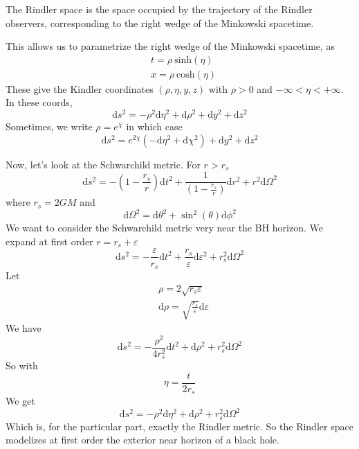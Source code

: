 \documentclass[a4paper]{book}
\theoremstyle{definition}
\theoremstyle{remark}
\begin{document}
The Rindler space is the space occupied by the trajectory of the Rindler observers, corresponding to the right wedge of the Minkowski spacetime. \par \medskip 
This allows us to parametrize the right wedge of the Minkowski spacetime, as 
\begin{equation}
   \begin{aligned}
    &t = \rho ~ \text{sinh}(\eta) \\
    &x = \rho ~ \text{cosh}(\eta)
   \end{aligned}
\end{equation}
These give the Kindler coordinates $(\rho, \eta, y, z)$ with $\rho > 0$ and $-\infty < \eta < + \infty$. In these coords, 
\begin{equation}
    \text{d}s^2 = -\rho^2 \text{d}\eta^2 + \text{d}\rho ^2 + \text{d}y^2 + \text{d}z^2
\end{equation}
Sometimes, we write $\rho = e^\chi$ in which case 
\begin{equation}
    \text{d}s^2 = e^{2\chi}\left(-\text{d}\eta^2 + \text{d}\chi^2 \right) + \text{d}y^2 + \text{d}z^2
\end{equation}\bigskip 

Now, let's look at the Schwarchild metric. For $r > r_s$
\begin{equation}
    \text{d}s^2 = -\left(1-\frac{r_s}{r}\right)\text{d}t^2 + \frac{1}{(1-\frac{r_s}{r})}\text{d}r^2 + r^2\text{d}\Omega^2
\end{equation}
where $r_s = 2GM$ and 
\begin{equation}
    \text{d}\Omega^2 = \text{d}\theta^2 + \sin^2(\theta) \text{d}\phi^2
\end{equation}
We want to consider the Schwarchild metric very near the BH horizon. We expand at first order $r = r_s + \varepsilon$
\begin{equation}
    \text{d}s^2 = -\frac{\varepsilon}{r_s}\text{d}t^2 + \frac{r_s}{\varepsilon}\text{d}\varepsilon^2 + r_s^2\text{d}\Omega^2
\end{equation}
Let 
\begin{equation}
    \begin{aligned}
        &\rho = 2\sqrt{r_s\varepsilon}\\
        & \text{d}\rho = \sqrt{\frac{r_s}{\varepsilon}}\text{d}\varepsilon
    \end{aligned}
\end{equation}
We have 
\begin{equation}
    \text{d}s^2 = -\frac{\rho^2}{4r_s^2}\text{d}t^2 + \text{d}\rho^2 + r_s^2\text{d}\Omega^2
\end{equation}
So with 
\begin{equation}
    \eta = \frac{t}{2r_s}
\end{equation}
We get 
\begin{equation}
    \text{d}s^2 = -\rho^2\text{d}\eta^2 + \text{d}\rho^2 + r_s^2\text{d}\Omega^2
\end{equation}
Which is, for the particular part, exactly the Rindler metric. So the Rindler space modelizes at first order the exterior near horizon of a black hole.
\end{document}
